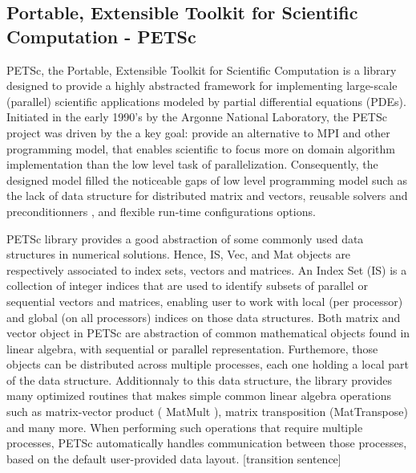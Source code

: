 \subsection{Portable, Extensible Toolkit for Scientific Computation - PETSc}



PETSc, the Portable, Extensible Toolkit for  Scientific Computation is a library designed to provide a highly abstracted framework for implementing large-scale (parallel) scientific applications modeled by partial differential equations (PDEs).  Initiated in the early 1990’s by the Argonne National Laboratory, the PETSc project was driven by the a key goal: provide an alternative to MPI and other programming model, that enables scientific to focus more on domain algorithm implementation than the low level task of parallelization. Consequently, the designed model filled the noticeable gaps of low level programming model such as the lack of data structure for distributed matrix and vectors, reusable solvers and preconditionners , and flexible run-time configurations options.


PETSc library provides a good abstraction of some commonly used data structures in numerical solutions. Hence, IS, Vec, and Mat objects are respectively associated to index sets, vectors and matrices. An Index Set (IS) is a collection of integer indices that are used to identify subsets of parallel or sequential vectors and matrices, enabling user to work with local (per processor) and global (on all processors) indices on those data structures. Both matrix and vector object in PETSc are abstraction of common mathematical objects found in linear algebra, with sequential or parallel representation. Furthemore, those objects can be distributed across multiple processes, each one holding a local part of the data structure. Additionnaly to this data structure, the library provides many optimized routines that makes simple common linear algebra operations such as matrix-vector product ( MatMult ), matrix transposition (MatTranspose) and many more. When performing such operations that require multiple processes, PETSc automatically handles communication between those processes, based on the default  user-provided data layout. [transition sentence]


